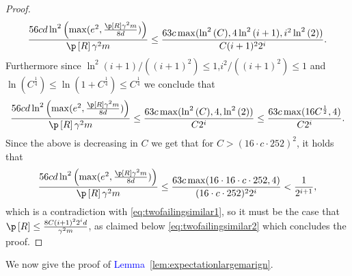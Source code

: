 \begin{proof}
    \begin{align*}
        \frac{56 cd\ln^{2}{\left( \max(e^{2},\frac{\p\left[R\right]\gamma^{2}m}{8d})\right)}}{\p\left[R\right]\gamma^{2}m}\leq \frac{63 c \max(\ln^{2}{\left(C \right)},4\ln^{2}{\left(i+1 \right)},i^{2}\ln^{2}{\left(2 \right)})}{ C(i+1)^{2}2^{i}}.
    \end{align*} 
    Furthermore since $ \ln^{2}{\left(i+1 \right)}/((i+1)^{2})\leq 1 $,$ i^{2}/((i+1)^{2})\leq 1 $ and $ \ln{\left(C^{\frac{1}{4}} \right)}\leq\ln{\left(1+C^{\frac{1}{4}} \right)} \leq C^{\frac{1}{4}}$  we conclude that 
    \begin{align*}
        \frac{56 cd\ln^{2}{\left( \max(e^{2},\frac{\p\left[R\right]\gamma^{2}m}{8d})\right)}}{\p\left[R\right]\gamma^{2}m}\leq \frac{63 c \max(\ln^{2}{\left(C \right)},4,\ln^{2}{\left(2 \right)})}{ C2^{i}}\leq \frac{63 c \max(16C^{\frac{1}{2}},4)}{ C2^{i}}.
    \end{align*}
    Since the above is decreasing in $ C $ we get that for $ C>(16\cdot c\cdot 252)^2 $, it holds that
    \begin{align*}
        \frac{56 cd\ln^{2}{\left( \max(e^{2},\frac{\p\left[R\right]\gamma^{2}m}{8d})\right)}}{\p\left[R\right]\gamma^{2}m}\leq \frac{63 c \max(16\cdot16\cdot c\cdot 252,4)}{ (16\cdot c\cdot 252)^2 2^{i}}<\frac{1}{2^{i+1}},
    \end{align*}  
    which is a contradiction with \cref{eq:twofailingsimilar1}, so it must be the case that $  \p\left[R\right]\leq \frac{8C(i+1)^{2}2^{i}d}{\gamma^{2}m}$, as claimed below \cref{eq:twofailingsimilar2} which concludes the proof.   
\end{proof}

We now give the proof of \textcolor{blue}{Lemma}~\ref{lem:expectationlargemarign}.


